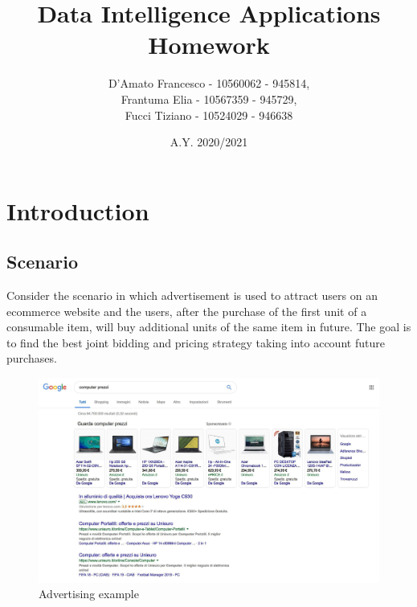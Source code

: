 \documentclass[12pt,a4paper]{report}
\title{Data Intelligence Applications Homework}
\author{D'Amato Francesco - 10560062 - 945814, \\
	Frantuma Elia - 10567359 - 945729, \\
	Fucci Tiziano - 10524029 - 946638}
\date{A.Y. 2020/2021}
\begin{document}
	\maketitle
	\tableofcontents
	\chapter{Introduction}
		\section{Scenario}
			Consider the scenario in which advertisement is used to attract users on an ecommerce website and the users, after the purchase of the first unit of a consumable item, will buy additional units of the same item in future. The goal is to find the best joint bidding and pricing strategy taking into account future purchases.

\begin{figure}[H]
\centering
  \includegraphics[scale = 0.3, center]{image0}
  \caption{Advertising example}
\end{figure}
\end{document}
